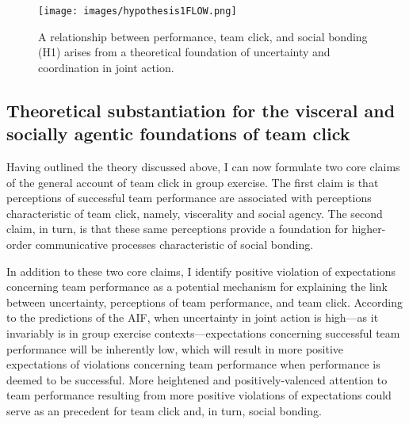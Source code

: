 \begin{CJK}{UTF8}{gbsn}
\begin{figure}[htbp]
  \texttt{[image: images/hypothesis1FLOW.png]}
  \caption{A relationship between performance, team click, and social bonding (H1) arises from a theoretical foundation of uncertainty and coordination in joint action.}
  \label{fig:hypothesis1FLOW}
\end{figure}









\subsection{Theoretical substantiation for the visceral and socially agentic foundations of team click \label{sect:visceralAgency}}

Having outlined the theory discussed above, I can now formulate two core claims of the general account of team click in group exercise.  The first claim is that perceptions of successful team performance are associated with perceptions characteristic of team click, namely, viscerality and social agency.  The second claim, in turn, is that these same perceptions provide a foundation for higher-order communicative processes characteristic of social bonding.

In addition to these two core claims, I identify positive violation of expectations concerning team performance as a potential mechanism for explaining the link between uncertainty, perceptions of team performance, and team click.  According to the predictions of the AIF, when uncertainty in joint action is high---as it invariably is in group exercise contexts---expectations concerning successful team performance will be inherently low, which will result in more positive expectations of violations concerning team performance when performance is deemed to be successful.  More heightened and positively-valenced attention to team performance resulting from more positive violations of expectations could serve as an precedent for team click and, in turn, social bonding.



\end{CJK}
